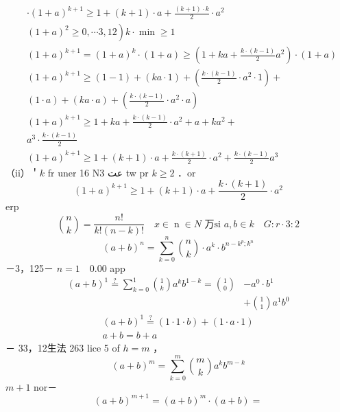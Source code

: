 \documentclass[12pt]{article}
\begin{document}
\[
\begin{aligned}
& \cdot(1+a)^{k+1} \geq 1+(k+1) \cdot a+\frac{(k+1) \cdot k}{2} \cdot a^{2} \\
& \left.(1+a)^{2} \geq 0, \cdots 3,12\right) k \cdot \min \geq 1 \\
& (1+a)^{k+1}=(1+a)^{k} \cdot(1+a) \geq\left(1+k a+\frac{k \cdot(k-1)}{2} a^{2}\right) \cdot(1+a) \\
& (1+a)^{k+1} \geq(1-1)+(k a \cdot 1)+\left(\frac{k \cdot(k-1)}{2} \cdot a^{2} \cdot 1\right)+ \\
& (1 \cdot a)+(k a \cdot a)+\left(\frac{k \cdot(k-1)}{2} \cdot a^{2} \cdot a\right) \\
& (1+a)^{k+1} \geq 1+k a+\frac{k \cdot(k-1)}{2} \cdot a^{2}+a+k a^{2}+ \\
& a^{3} \cdot \frac{k \cdot(k-1)}{2} \\
& (1+a)^{k+1} \geq 1+(k+1) \cdot a+\frac{k \cdot(k+1)}{2} \cdot a^{2}+\frac{k \cdot(k-1)}{2} a^{3}
\end{aligned}
\]
（ii）＇\(k\) fr uner 16 Nعت 3 tw pr \(k \geq 2\) ．or
\[
(1+a)^{k+1} \geqslant 1+(k+1) \cdot a+\frac{k \cdot(k+1)}{2} \cdot a^{2}
\]
erp
\[
\binom{n}{k}=\frac{n!}{k!(n-k)!} \quad x \in \operatorname{n} \in N \text { 万si } a, b \in k \quad G: r \cdot 3: 2
\]
\[
(a+b)^{n}=\sum_{k=0}^{n}\binom{n}{k} \cdot a^{k} \cdot b^{n-k^{p} ; k^{n}}
\]
－3，125－
\(n=1 \quad 0.00\) app
\[
\begin{aligned}
(a+b)^{1} \stackrel{?}{=} \sum_{k=0}^{1}\binom{1}{k} a^{k} b^{1-k}=\binom{1}{0} & -a^{0} \cdot b^{1} \\
& +\binom{1}{1} a^{1} b^{0}
\end{aligned}
\]
\[
\begin{gathered}
(a+b)^{1} \stackrel{?}{=}(1 \cdot 1 \cdot b)+(1 \cdot a \cdot 1) \\
a+b=b+a
\end{gathered}
\]
－
33，12生法 263
lice 5 of \(h=m\) ，
\[
(a+b)^{m}=\sum_{k=0}^{m}\binom{m}{k} a^{k} b^{m-k}
\]
\(m+1\) nor－
\[
(a+b)^{m+1}=(a+b)^{m} \cdot(a+b)=
\]
\end{document}
